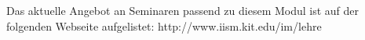\begin{module}
\begin{content}
\end{content}

\begin{remarks}Das aktuelle Angebot an Seminaren passend zu diesem Modul ist auf der folgenden Webseite aufgelistet: http://www.iism.kit.edu/im/lehre

\end{remarks}

\end{module}

